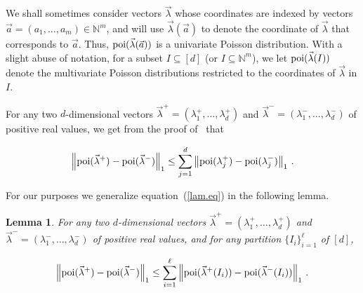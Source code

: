 \documentclass[10pt]{article}
\newtheorem{lemma}[theorem]{Lemma}
\theoremstyle{definition}
\numberwithin{equation}{section}
\newcommand{\poi}{{\rm poi}}
\newcommand{\BEQN}{\begin{eqnarray}}\newcommand{\EEQN}{\end{eqnarray}}
\begin{document}
We shall sometimes consider vectors $\vec{\lambda}$ whose coordinates are indexed
by vectors  $\vec{a} = (a_1,\ldots,a_m) \in \mathbb{N}^m$, and will use
$\vec{\lambda}(\vec{a})$ to denote the coordinate of $\vec{\lambda}$
that corresponds to $\vec{a}$. Thus, $\poi(\vec{\lambda}(\vec{a}))$
is a univariate Poisson distribution.
With a slight abuse of notation, for a subset $I \subseteq [d]$
(or $I \subseteq \mathbb{N}^m$),
we let $\poi(\vec{\lambda}(I))$ denote the multivariate Poisson
distributions restricted to the coordinates of $\vec{\lambda}$ in $I$.

For any two $d$-dimensional vectors $\vec{\lambda}^+ = (\lambda^+_1,\ldots,\lambda^+_d)$ and
$\vec{\lambda}^- = (\lambda^-_1,\ldots,\lambda^-_d)$ of positive real values, we get from the proof of~\cite[Lemma 4.5.3]{valphd} that
%

\BEQN
\left\|\poi(\vec{\lambda}^+) - \poi(\vec{\lambda}^-) \right\|_1
   \leq
    \sum_{j=1}^d \left\|\poi(\lambda^+_j) - \poi(\lambda^-_j) \right\|_1 \,. \label{lam.eq}
\EEQN







%
For our purposes we generalize equation~(\ref{lam.eq}) in the following lemma.

\begin{lemma} \label{disval.lem}
For any two $d$-dimensional vectors $\vec{\lambda}^+ = (\lambda^+_1,\ldots,\lambda^+_d)$ and
$\vec{\lambda}^- = (\lambda^-_1,\ldots,\lambda^-_d)$ of positive real values, and for
any partition $\{I_i\}_{i=1}^{\ell}$ of $[d]$,
%
%
%

\BEQN
\left\|\poi(\vec{\lambda}^+) - \poi(\vec{\lambda}^-) \right\|_1
   \leq
    \sum_{i=1}^\ell \left\|\poi(\vec{\lambda}^+(I_i))
      - \poi(\vec{\lambda}^-(I_i)) \right\|_1 \,.
\EEQN








%
\end{lemma}
\end{document}
